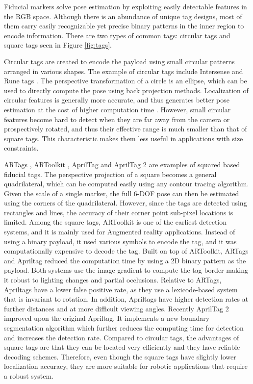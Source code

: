 	Fiducial markers solve pose estimation by exploiting easily detectable features in the RGB space. Although there is an abundance of unique tag designs, most of them carry easily recognizable yet precise binary patterns in the inner region to encode information. There are two types of common tags: circular tags and square tags seen in Figure \ref{fig:tags}. 
	
	Circular tags are created to encode the payload using small circular patterns arranged in various shapes. The example of circular tags include Intersense \citep{naimark2002circular} and Rune tags \citep{bergamasco2011rune}. The perspective transformation of a circle is an ellipse, which can be used to directly compute the pose using back projection methods. Localization of circular features is generally more accurate, and thus generates better pose estimation at the cost of higher computation time \citep{rice2006analysing}. However, small circular features become hard to detect when they are far away from the camera or prospectively rotated, and thus their effective range is much smaller than that of square tags. This characteristic makes them less useful in applications with size constraints. 
	
	ARTags \citep{fiala2004artag}, ARToolkit \citep{kato2002artoolkit}, AprilTag \citep{olson2011apriltag} and AprilTag 2 \citep{wang2016apriltag} are examples of squared based fiducial tags. The perspective projection of a square becomes a general quadrilateral, which can be computed easily using any contour tracing algorithm. Given the scale of a single marker, the full 6-DOF pose can then be estimated using the corners of the quadrilateral. However, since the tags are detected using rectangles and lines, the accuracy of their corner point sub-pixel locations is limited. Among the square tags, ARToolkit is one of the earliest detection systems, and it is mainly used for Augmented reality applications. Instead of using a binary payload, it used various symbols to encode the tag, and it was computationally expensive to decode the tag. Built on top of ARToolkit, ARTags and Apriltag reduced the computation time by using a 2D binary pattern as the payload. Both systems use the image gradient to compute the tag border making it robust to lighting changes and partial occlusions. Relative to ARTags, Apriltags have a lower false positive rate, as they use a lexicode-based system that is invariant to rotation. In addition, Apriltags have higher detection rates at further distances and at more difficult viewing angles. Recently AprilTag 2 improved upon the original Apriltag. It implements a new boundary segmentation algorithm which further reduces the computing time for detection and increases the detection rate. Compared to circular tags, the advantages of square tags are that they can be located very efficiently and they have reliable decoding schemes. Therefore, even though the square tags have slightly lower localization accuracy, they are more suitable for robotic applications that require a robust system.